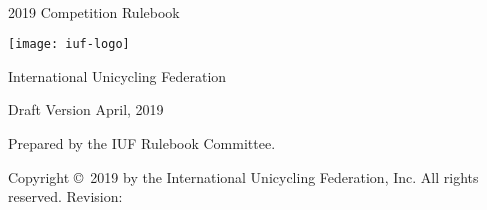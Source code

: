 \begin{titlepage}
\centering
\ \\
\vspace{5cm}
{\Huge 2019 Competition Rulebook}
\vspace{5mm}

\texttt{[image: iuf-logo]}

\vspace{5mm}
{\huge International Unicycling Federation}

\vspace{5mm}
{\Large Draft Version \quad April, 2019}

\vspace{45mm}
Prepared by the IUF Rulebook Committee.

\vspace{5mm}
{\small Copyright \copyright\ 2019 by the International Unicycling Federation, Inc. All rights reserved.}
\small{Revision: \href{https://github.com/iuf/rulebook/commit/\gitHash}{\gitAbbrevHash} \ \gitCommitterDate}

\end{titlepage}
